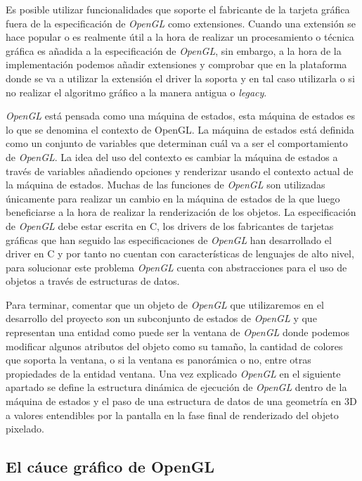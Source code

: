 \documentclass[a4paper]{book}
\begin{document}
Es posible utilizar funcionalidades que soporte el fabricante de la tarjeta gráfica fuera de la especificación de \textit{OpenGL}
como extensiones. Cuando una extensión se hace popular o es realmente útil a la hora de realizar un procesamiento o
técnica gráfica es añadida a la especificación de \textit{OpenGL}, sin embargo, a la hora de la implementación podemos añadir
extensiones y comprobar que en la plataforma donde se va a utilizar la extensión el driver la soporta y en tal caso
utilizarla o si no realizar el algoritmo gráfico a la manera antigua o \textit{legacy}.

\textit{OpenGL} está pensada como una máquina de estados, esta máquina de estados es lo que se denomina el contexto de OpenGL. La máquina de
estados está definida como un conjunto de variables que determinan cuál va a ser el comportamiento de \textit{OpenGL}. La idea del uso del
contexto es cambiar la máquina de estados a través de variables añadiendo opciones y renderizar usando el contexto actual de la máquina
de estados. Muchas de las funciones de \textit{OpenGL} son utilizadas únicamente para realizar un cambio en la máquina de estados de la
que luego beneficiarse a la hora de realizar la renderización de los objetos. La especificación de \textit{OpenGL} debe estar escrita en C,
los drivers de los fabricantes de tarjetas gráficas que han seguido las especificaciones de \textit{OpenGL} han desarrollado el driver en C y por
tanto no cuentan con características de lenguajes de alto nivel, para solucionar este problema \textit{OpenGL} cuenta con abstracciones
para el uso de objetos a través de estructuras de datos.

Para terminar, comentar que un objeto de \textit{OpenGL} que utilizaremos en el desarrollo del proyecto son un subconjunto de estados
de \textit{OpenGL} y que representan una entidad como puede ser la ventana de \textit{OpenGL} donde podemos modificar algunos atributos del
objeto como su tamaño, la cantidad de colores que soporta la ventana, o si la ventana es panorámica o no, entre otras
propiedades de la entidad ventana. Una vez explicado \textit{OpenGL} en el siguiente apartado se define la estructura dinámica de ejecución
de \textit{OpenGL} dentro de la máquina de estados y el paso de una estructura de datos de una geometría en 3D a valores entendibles por
la pantalla en la fase final de renderizado del objeto pixelado. \cite{book:_opengl}

\subsection{El cáuce gráfico de OpenGL}
\label{subsec:CauceOpenGL}
\end{document}
